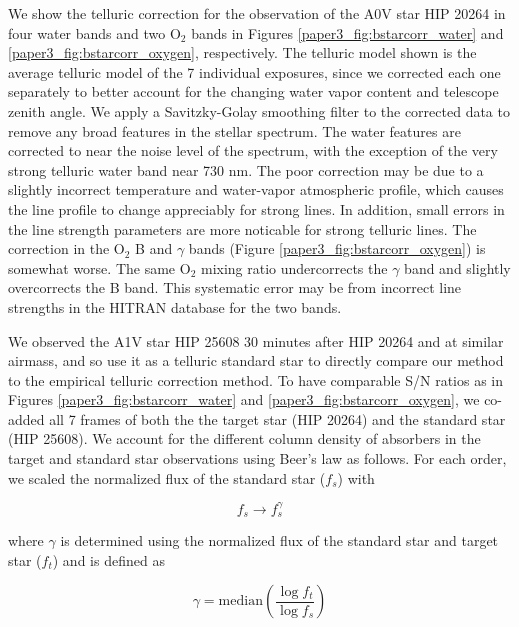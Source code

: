 We show the telluric correction for the observation of the A0V star HIP 20264 in four water bands and two $\mathrm{O_2}$ bands in Figures \ref{paper3_fig:bstarcorr_water} and \ref{paper3_fig:bstarcorr_oxygen}, respectively. The telluric model shown is the average telluric model of the 7 individual exposures, since we corrected each one separately to better account for the changing water vapor content and telescope zenith angle. We apply a Savitzky-Golay smoothing filter to the corrected data to remove any broad features in the stellar spectrum. The water features are corrected to near the noise level of the spectrum, with the exception of the very strong telluric water band near 730 nm. The poor correction may be due to a slightly incorrect temperature and water-vapor atmospheric profile, which causes the line profile to change appreciably for strong lines. In addition, small errors in the line strength parameters are more noticable for strong telluric lines. The correction in the $\mathrm{O_2}$ B and $\gamma$ bands (Figure \ref{paper3_fig:bstarcorr_oxygen}) is somewhat worse. The same $\mathrm{O_2}$ mixing ratio undercorrects the $\gamma$ band and slightly overcorrects the B band. This systematic error may be from incorrect line strengths in the HITRAN database for the two bands. 

We observed the A1V star HIP 25608 30 minutes after HIP 20264 and at similar airmass, and so use it as a telluric standard star to directly compare our method to the empirical telluric correction method. To have comparable S/N ratios as in Figures \ref{paper3_fig:bstarcorr_water} and \ref{paper3_fig:bstarcorr_oxygen}, we co-added all 7 frames of both the the target star (HIP 20264) and the standard star (HIP 25608). We account for the different column density of absorbers in the target and standard star observations using Beer's law \citep{Beer1852} as follows. For each order, we scaled the normalized flux of the standard star ($f_s$) with

\begin{equation}
f_s \rightarrow f_s^{\gamma}
\label{paper3_eqn:correction}
\end{equation}

where $\gamma$ is determined using the normalized flux of the standard star and target star ($f_t$) and is defined as

\begin{equation}
\gamma = \text{median} \left( \frac{\log{f_t}}{\log{f_s}} \right)
\label{paper3_eqn:scale}
\end{equation}

